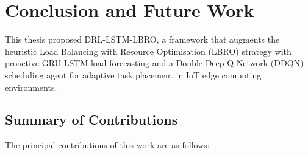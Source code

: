 \chapter{Conclusion and Future Work}
\label{chap:conclusion}

This thesis proposed DRL-LSTM-LBRO, a framework that augments
the heuristic Load Balancing with Resource Optimisation (LBRO)
strategy with proactive GRU-LSTM load forecasting and a
Double Deep Q-Network (DDQN) scheduling agent for adaptive
task placement in IoT edge computing environments.

\section{Summary of Contributions}
\label{sec:summary}

The principal contributions of this work are as follows:

